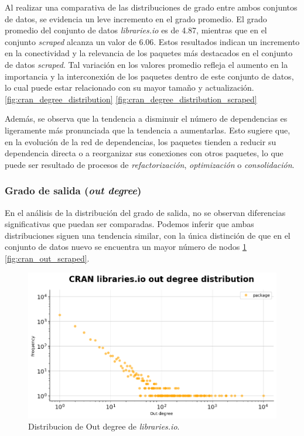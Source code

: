 Al realizar una comparativa de las distribuciones de grado entre ambos conjuntos de datos,
se evidencia un leve incremento en el grado promedio. El grado promedio del conjunto de datos
\textit{libraries.io} es de 4.87, mientras que en el conjunto \textit{scraped} alcanza un valor
de 6.06. Estos resultados indican un incremento en la conectividad y la relevancia de los
paquetes más destacados en el conjunto de datos \textit{scraped}. Tal variación en los valores
promedio refleja el aumento en la importancia y la interconexión de los paquetes dentro de este
conjunto de datos, lo cual puede estar relacionado con su mayor tamaño y actualización.
\ref{fig:cran_degree_distribution} \ref{fig:cran_degree_distribution_scraped}

Además, se observa que la tendencia a disminuir el número de dependencias es ligeramente
más pronunciada que la tendencia a aumentarlas. Esto sugiere que, en la evolución de
la red de dependencias, los paquetes tienden a reducir su dependencia directa o a
reorganizar sus conexiones con otros paquetes, lo que puede ser resultado de procesos
de \textit{refactorización}, \textit{optimización} o \textit{consolidación}.


\subsubsection{Grado de salida (\textit{out degree})}


En el análisis de la distribución del grado de salida, no se observan diferencias significativas
que puedan ser comparadas. Podemos inferir que ambas distribuciones siguen una tendencia
similar, con la única distinción de que en el conjunto de datos nuevo se encuentra un mayor
número de nodos \ref{fig:cran_out_lib} \ref{fig:cran_out_scraped}.

\begin{figure}[h!]
    \begin{center}
        \includegraphics[width=1\textwidth]{img/cran/out_deg.png}
        \caption{Distribucion de Out degree de \textit{libraries.io}.}
        \label{fig:cran_out_lib}
    \end{center}
\end{figure}

